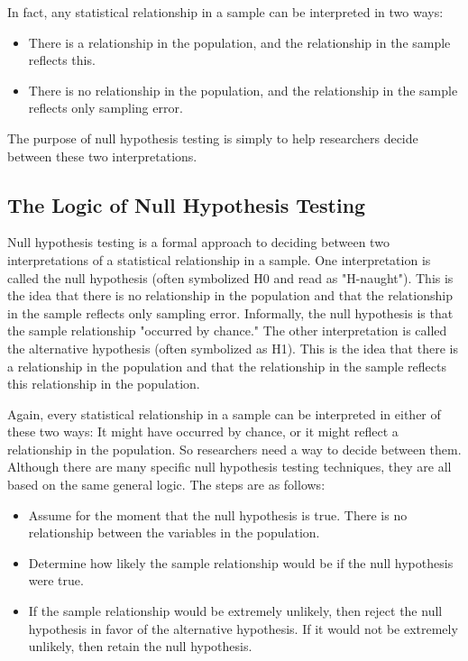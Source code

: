 In fact, any statistical relationship in a sample can be interpreted in two ways:


\begin{itemize}
\item There is a relationship in the population, and the relationship in the sample reflects this.

\item There is no relationship in the population, and the relationship in the sample reflects only sampling error.
  
\end{itemize}

The purpose of null hypothesis testing is simply to help researchers decide between these two interpretations.


\subsection{The Logic of Null Hypothesis Testing}

Null hypothesis testing is a formal approach to deciding between two interpretations of a statistical relationship in a sample. One interpretation is called the null hypothesis (often symbolized H0 and read as "H-naught"). This is the idea that there is no relationship in the population and that the relationship in the sample reflects only sampling error. Informally, the null hypothesis is that the sample relationship "occurred by chance." The other interpretation is called the alternative hypothesis (often symbolized as H1). This is the idea that there is a relationship in the population and that the relationship in the sample reflects this relationship in the population.


Again, every statistical relationship in a sample can be interpreted in either of these two ways: It might have occurred by chance, or it might reflect a relationship in the population. So researchers need a way to decide between them. Although there are many specific null hypothesis testing techniques, they are all based on the same general logic. The steps are as follows:

\begin{itemize}
\item Assume for the moment that the null hypothesis is true. There is no relationship between the variables in the population.

\item Determine how likely the sample relationship would be if the null hypothesis were true.

\item If the sample relationship would be extremely unlikely, then reject the null hypothesis in favor of the
alternative hypothesis. If it would not be extremely unlikely, then retain the null hypothesis.

\end{itemize}

